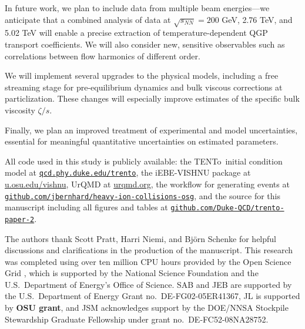 \documentclass[aps,prc,reprint,amsmath,nofootinbib]{revtex4-1}
\newcommand{\trento}{T\raisebox{-0.5ex}{R}ENTo}
\newcommand{\sqrts}{\sqrt{s_{NN}}}
\begin{document}

In future work, we plan to include data from multiple beam energies---we anticipate that a combined analysis of data at $\sqrts = 200$ GeV, 2.76 TeV, and 5.02 TeV will enable a precise extraction of temperature-dependent QGP transport coefficients.
We will also consider new, sensitive observables such as correlations between flow harmonics of different order.

We will implement several upgrades to the physical models, including a free streaming stage for pre-equilibrium dynamics and bulk viscous corrections at particlization.
These changes will especially improve estimates of the specific bulk viscosity $\zeta/s$.

Finally, we plan an improved treatment of experimental and model uncertainties, essential for meaningful quantitative uncertainties on estimated parameters.

\bigskip

\newcommand{\nicelink}[2][http]{\mbox{\href{#1://#2}{\nolinkurl{#2}}}}

All code used in this study is publicly available:
the \trento\ initial condition model at \nicelink{qcd.phy.duke.edu/trento},
the iEBE-VISHNU package at \url{u.osu.edu/vishnu},
UrQMD at \url{urqmd.org},
the workflow for generating events at \nicelink[https]{github.com/jbernhard/heavy-ion-collisions-osg},
and the source for this manuscript including all figures and tables at \nicelink[https]{github.com/Duke-QCD/trento-paper-2}.

\begin{acknowledgments}
The authors thank Scott Pratt, Harri Niemi, and Bj\"orn Schenke for helpful discussions and clarifications in the production of the manuscript.
This research was completed using over ten million CPU hours provided by the Open Science Grid \cite{Pordes:2007zzb,Sfiligoi:2010zz}, which is supported by the National Science Foundation and the U.S.\ Department of Energy's Office of Science.
SAB and JEB are supported by the U.S.\ Department of Energy Grant no.~DE-FG02-05ER41367,
JL is supported by {\bf OSU grant},
and JSM acknowledges support by the DOE/NNSA Stockpile Stewardship Graduate Fellowship under grant no.~DE-FC52-08NA28752.
\end{acknowledgments}


\end{document}
